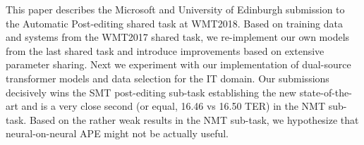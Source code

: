 This paper describes the Microsoft and University of Edinburgh submission to the Automatic Post-editing shared task at WMT2018. Based on training data and systems from the WMT2017 shared task, we re-implement our own models from the last shared task and introduce improvements based on extensive parameter sharing. Next we experiment with our implementation of dual-source transformer models and data selection for the IT domain. Our submissions decisively wins the SMT post-editing sub-task establishing the new state-of-the-art and is a very close second (or equal, 16.46 vs 16.50 TER) in the NMT sub-task. Based on the rather weak results in the NMT sub-task, we hypothesize that neural-on-neural APE might not be actually useful.
